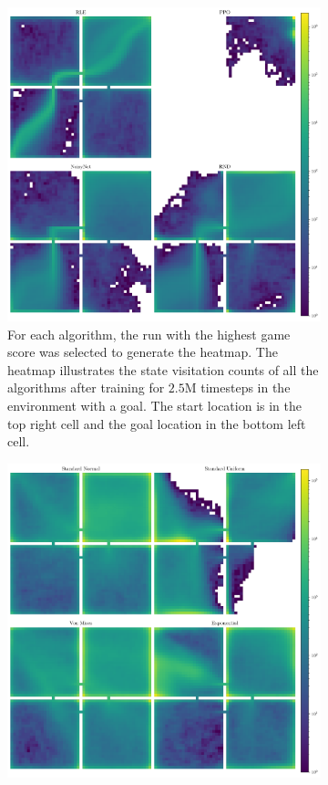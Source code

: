 \begin{figure}[h!]
\begin{subfigure}[b]{0.45\textwidth}
    \centering
    \includegraphics[width=\textwidth]{figures/gridworld_heatmaps_goal_algorithms.pdf}
    \caption{For each algorithm, the run with the highest game score was selected to generate the heatmap. The heatmap illustrates the state visitation counts of all the algorithms after training for $2.5$M timesteps in the environment with a goal. The start location is in the top right cell and the goal location in the bottom left cell.}
    \label{fig:gridworld-heatmap-goal-algorithms}
  \end{subfigure}
  \begin{subfigure}[b]{0.45\textwidth}
    \centering
    \includegraphics[width=\textwidth]{figures/gridworld_heatmaps_no_goal_distributions.pdf}

\end{subfigure}
\end{figure}
